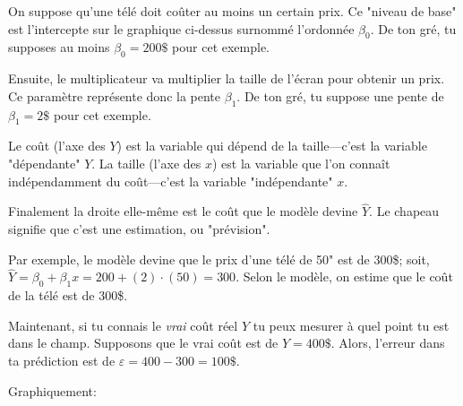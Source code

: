 \documentclass[10pt, french]{article}
\begin{document}
\begin{multicols*}{2}
\begin{center}

\end{center}

On suppose qu'une télé doit coûter au moins un certain prix. Ce "niveau de base" est l'intercepte sur le graphique ci-dessus surnommé l'ordonnée $\beta_{0}$. De ton gré, tu supposes au moins $\beta_{0} = 200\$$ pour cet exemple. 

Ensuite, le multiplicateur va multiplier la taille de l'écran pour obtenir un prix. Ce paramètre représente donc la pente $\beta_{1}$. De ton gré, tu suppose une pente de $\beta_{1} = 2\$$ pour cet exemple. 

Le coût (l'axe des $Y$) est la variable qui dépend de la taille---c'est la variable "dépendante" $Y$. La taille (l'axe des $x$) est la variable que l'on connaît indépendamment du coût---c'est la variable "indépendante" $x$. 

Finalement la droite elle-même est le coût que le modèle devine $\hat{Y}$. Le chapeau signifie que c'est une estimation, ou "prévision".

Par exemple, le modèle devine que le prix d'une télé de 50" est de 300\$; soit, $\hat{Y} = \beta_{0} + \beta_{1} x = 200 + (2) \cdot (50) = 300$. Selon le modèle, on estime que le coût de la télé est de 300\$.

Maintenant, si tu connais le \textit{vrai} coût réel $Y$ tu peux mesurer à quel point tu est dans le champ. Supposons que le vrai coût est de $Y = 400\$$. Alors, l'erreur dans ta prédiction est de $\varepsilon = 400 - 300 = 100\$$. 

Graphiquement:



\begin{tikzpicture}[x=0.75pt,y=0.75pt,yscale=-1,xscale=1]


\end{tikzpicture}
\end{multicols*}
\end{document}
